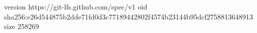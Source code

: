 version https://git-lfs.github.com/spec/v1
oid sha256:e26d544875b2dde71fd0d3c77189442802f4574b23144b95dcf2758813648913
size 258269
